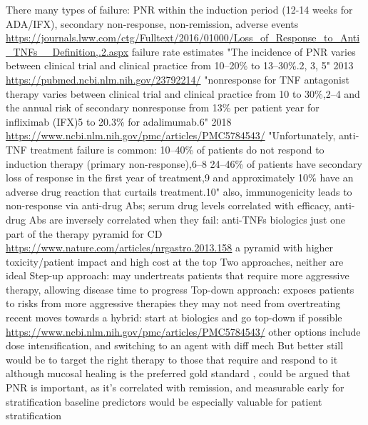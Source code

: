 \begin{outline}
\1 There many types of failure: \gls{PNR} within the induction period (12-14 weeks for ADA/IFX), secondary non-response, non-remission, adverse events \url{https://journals.lww.com/ctg/Fulltext/2016/01000/Loss_of_Response_to_Anti_TNFs__Definition,.2.aspx}
    \2 failure rate estimates 
        \3 "The incidence of PNR varies between clinical trial and clinical practice from 10–20\% to 13–30\%.2, 3, 5" 2013 \url{https://pubmed.ncbi.nlm.nih.gov/23792214/}
        \3 "nonresponse for TNF antagonist therapy varies between clinical trial and clinical practice from 10 to 30\%,2–4 and the annual risk of secondary nonresponse from 13\% per patient year for infliximab (IFX)5 to 20.3\% for adalimumab.6" 2018 \url{https://www.ncbi.nlm.nih.gov/pmc/articles/PMC5784543/}
        \3 "Unfortunately, anti-TNF treatment failure is common: 10–40\% of patients do not respond to induction therapy (primary non-response),6–8 24–46\% of patients have secondary loss of response in the first year of treatment,9 and approximately 10\% have an adverse drug reaction that curtails treatment.10" \autocite{kennedy2019PredictorsAntiTNFTreatment}
    \2 also, immunogenicity leads to non-response via anti-drug Abs; serum drug levels correlated with efficacy, anti-drug Abs are inversely correlated \autocite{lichtenstein2013ComprehensiveReviewAntitumor}
    \2 when they fail: anti-TNFs biologics just one part of the therapy pyramid for CD \url{https://www.nature.com/articles/nrgastro.2013.158}
    \2 a pyramid with higher toxicity/patient impact and high cost at the top
    \2 Two approaches, neither are ideal
        \3 Step-up approach: may undertreats patients that require more aggressive therapy, allowing disease time to progress
        \3 Top-down approach: exposes patients to risks from more aggressive therapies they may not need from overtreating
        \3 recent moves towards a hybrid: start at biologics and go top-down if possible \url{https://www.ncbi.nlm.nih.gov/pmc/articles/PMC5784543/}
    \2 other options include dose intensification, and switching to an agent with diff mech \autocite{lichtenstein2013ComprehensiveReviewAntitumor}
    \2 But better still would be to target the right therapy to those that require and respond to it
        \3 although mucosal healing is the preferred gold standard \autocite{roda2020CrohnDisease}, could be argued that PNR is important, as it's correlated with remission, and measurable early for stratification
        \3 baseline predictors would be especially valuable for patient stratification


\end{outline}
